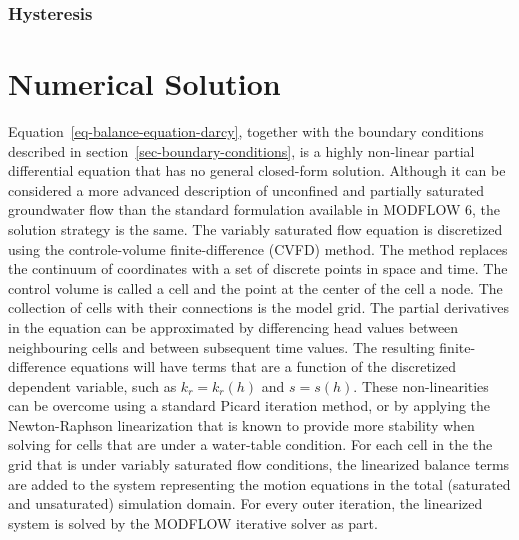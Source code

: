 \documentclass[fleqn]{article}
\begin{document}
\subsubsection{Hysteresis}

\section{Numerical Solution}
\label{sec-num-sol}
Equation~\ref{eq-balance-equation-darcy}, together with the boundary 
conditions described in section~\ref{sec-boundary-conditions}, is a 
highly non-linear partial differential equation that has no general 
closed-form solution.
Although it can be considered a more advanced description of unconfined
and partially saturated groundwater flow than the standard formulation
available in MODFLOW 6, the solution strategy is the same. The variably
saturated flow equation is discretized using the controle-volume
finite-difference (CVFD) method. The method replaces the continuum of
coordinates with a set of discrete points in space and time. 
The control volume is called a cell and the  point at the center of 
the cell a node. The collection of cells with their connections is the
model grid. The partial derivatives in the equation can be approximated
by differencing head values between neighbouring cells and between 
subsequent time values. The resulting finite-difference equations will 
have terms that are a function of the discretized dependent variable, 
such as $k_r = k_r(h)$ and $s = s(h)$. These non-linearities can be 
overcome using a standard Picard iteration method, or by applying 
the Newton-Raphson linearization that is known to provide more stability
when solving for cells that are under a water-table condition. 
For each cell in the the grid that is under variably saturated flow 
conditions, the linearized balance terms are added to the system 
representing the motion equations in the total (saturated and unsaturated) 
simulation domain. For every outer iteration, the linearized system is 
solved by the MODFLOW iterative solver as part.
\end{document}

